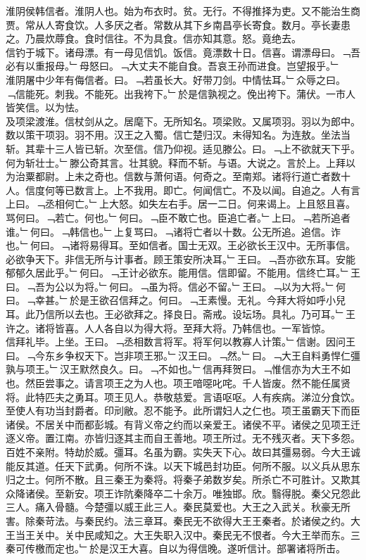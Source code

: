 \documentclass{zhvt-classic}
\begin{document}

\hspace*{2em}淮阴侯韩信者。淮阴人也。始为布衣时。贫。无行。不得推择为吏。又不能治生商贾。常从人寄食饮。人多厌之者。常数从其下乡南昌亭长寄食。数月。亭长妻患之。乃晨炊蓐食。食时信往。不为具食。信亦知其意。怒。竟绝去。\\
\hspace*{2em}信钓于城下。诸母漂。有一母见信饥。饭信。竟漂数十日。信喜。谓漂母曰。﹁吾必有以重报母。﹂母怒曰。﹁大丈夫不能自食。吾哀王孙而进食。岂望报乎。﹂\\
\hspace*{2em}淮阴屠中少年有侮信者。曰。﹁若虽长大。好带刀剑。中情怯耳。﹂众辱之曰。﹁信能死。刺我。不能死。出我袴下。﹂於是信孰视之。俛出袴下。蒲伏。一市人皆笑信。以为怯。\\
\hspace*{2em}及项梁渡淮。信杖剑从之。居麾下。无所知名。项梁败。又属项羽。羽以为郎中。数以策干项羽。羽不用。汉王之入蜀。信亡楚归汉。未得知名。为连敖。坐法当斩。其辈十三人皆已斩。次至信。信乃仰视。适见滕公。曰。﹁上不欲就天下乎。何为斩壮士。﹂滕公奇其言。壮其貌。释而不斩。与语。大说之。言於上。上拜以为治粟都尉。上未之奇也。信数与萧何语。何奇之。至南郑。诸将行道亡者数十人。信度何等已数言上。上不我用。即亡。何闻信亡。不及以闻。自追之。人有言上曰。﹁丞相何亡。﹂上大怒。如失左右手。居一二日。何来谒上。上且怒且喜。骂何曰。﹁若亡。何也。﹂何曰。﹁臣不敢亡也。臣追亡者。﹂上曰。﹁若所追者谁。﹂何曰。﹁韩信也。﹂上复骂曰。﹁诸将亡者以十数。公无所追。追信。诈也。﹂何曰。﹁诸将易得耳。至如信者。国士无双。王必欲长王汉中。无所事信。必欲争天下。非信无所与计事者。顾王策安所决耳。﹂王曰。﹁吾亦欲东耳。安能郁郁久居此乎。﹂何曰。﹁王计必欲东。能用信。信即留。不能用。信终亡耳。﹂王曰。﹁吾为公以为将。﹂何曰。﹁虽为将。信必不留。﹂王曰。﹁以为大将。﹂何曰。﹁幸甚。﹂於是王欲召信拜之。何曰。﹁王素慢。无礼。今拜大将如呼小兒耳。此乃信所以去也。王必欲拜之。择良日。斋戒。设坛场。具礼。乃可耳。﹂王许之。诸将皆喜。人人各自以为得大将。至拜大将。乃韩信也。一军皆惊。\\
\hspace*{2em}信拜礼毕。上坐。王曰。﹁丞相数言将军。将军何以教寡人计策。﹂信谢。因问王曰。﹁今东乡争权天下。岂非项王邪。﹂汉王曰。﹁然。﹂曰。﹁大王自料勇悍仁彊孰与项王。﹂汉王默然良久。曰。﹁不如也。﹂信再拜贺曰。﹁惟信亦为大王不如也。然臣尝事之。请言项王之为人也。项王喑噁叱咤。千人皆废。然不能任属贤将。此特匹夫之勇耳。项王见人。恭敬慈爱。言语呕呕。人有疾病。涕泣分食饮。至使人有功当封爵者。印刓敝。忍不能予。此所谓妇人之仁也。项王虽霸天下而臣诸侯。不居关中而都彭城。有背义帝之约而以亲爱王。诸侯不平。诸侯之见项王迁逐义帝。置江南。亦皆归逐其主而自王善地。项王所过。无不残灭者。天下多怨。百姓不亲附。特劫於威。彊耳。名虽为霸。实失天下心。故曰其彊易弱。今大王诚能反其道。任天下武勇。何所不诛。以天下城邑封功臣。何所不服。以义兵从思东归之士。何所不散。且三秦王为秦将。将秦子弟数岁矣。所杀亡不可胜计。又欺其众降诸侯。至新安。项王诈阬秦降卒二十余万。唯独邯。欣。翳得脱。秦父兄怨此三人。痛入骨髓。今楚彊以威王此三人。秦民莫爱也。大王之入武关。秋豪无所害。除秦苛法。与秦民约。法三章耳。秦民无不欲得大王王秦者。於诸侯之约。大王当王关中。关中民咸知之。大王失职入汉中。秦民无不恨者。今大王举而东。三秦可传檄而定也。﹂於是汉王大喜。自以为得信晚。遂听信计。部署诸将所击。\\
\end{document}
